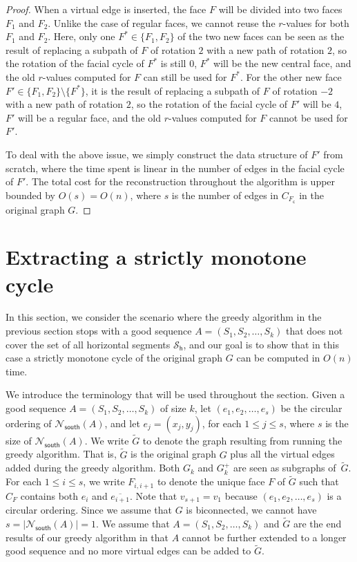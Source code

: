 \documentclass{theoretics}
\newcommand{\FC}{F_\mathsf{c}}
\newcommand{\PH}{\mathcal{S}_\mathsf{h}}
\newcommand{\Nsouth}{\mathcal{N}_\mathsf{south}}
\begin{document}
\begin{proof}
 
 
 When a virtual edge is inserted, the face $F$ will be divided into two faces $F_1$ and $F_2$. Unlike the case of regular faces, we cannot reuse the $r$-values for both  $F_1$ and $F_2$. Here, only one $F^\ast \in \{F_1, F_2\}$ of the two new faces can be seen as the result of replacing a subpath of $F$ of rotation $2$ with a new path of rotation $2$, so the rotation of the facial cycle of $F^\ast$ is still $0$,  $F^\ast$ will be the new central face, and the old $r$-values computed for $F$ can still be used for $F^\ast$.
 For the other new face $F' \in \{F_1, F_2\} \setminus \{F^\ast\}$, it is the result of replacing a subpath of $F$ of rotation $-2$ with a new path of rotation $2$, so the rotation of the facial cycle of $F'$ will be $4$,  $F'$ will be a regular face, and the old $r$-values computed for $F$ cannot be used for $F'$. 
 
 To deal with the above issue, we simply construct the data structure of $F'$ from scratch, where the time spent is linear in the number of edges in the facial cycle of $F'$. The total cost for the reconstruction throughout the algorithm is upper bounded by $O(s)=O(n)$, where $s$ is the number of edges in $C_{\FC}$ in the original graph $G$.
\end{proof}


\section{Extracting a strictly monotone cycle}\label{sect:cycle}

In this section, we consider the scenario where the greedy algorithm in the previous section stops with a good sequence $A=(S_1, S_2, \ldots, S_k)$ that does not cover the set of all horizontal segments $\PH$, and our goal is to show that in this case a strictly monotone cycle of the original graph $G$ can be computed in $O(n)$ time.

We introduce the terminology that will be used throughout the section. Given a good sequence $A=(S_1, S_2, \ldots, S_k)$ of size $k$, let $(e_1, e_2, \ldots, e_s)$ be the circular ordering of $\Nsouth(A)$, and let $e_j=(x_j, y_j)$, for each $1 \leq j \leq s$, where $s$ is the size of $\Nsouth(A)$. We write $\tilde{G}$ to denote the graph resulting from running the greedy algorithm. That is, $\tilde{G}$ is the original graph $G$ plus all the virtual edges added during the greedy algorithm. Both $G_k$ and $G_k^+$ are seen as subgraphs of~$\tilde{G}$. For each $1 \leq i \leq s$, we write $F_{i, i+1}$ to denote the unique face $F$ of $\tilde{G}$ such that $C_F$ contains both  ${e_{i}}$ and $\overline{e_{i+1}}$. Note that  $v_{s+1}=v_1$ because $(e_1, e_2, \ldots, e_s)$ is a circular ordering. Since we assume that $G$ is biconnected, we cannot have $s= |\Nsouth(A)| = 1$.
We assume that $A=(S_1, S_2, \ldots, S_k)$ and $\tilde{G}$ are the end results of our greedy algorithm in that $A$ cannot be further extended to a longer good sequence and no more virtual edges can be added to $\tilde{G}$. 
\end{document}
